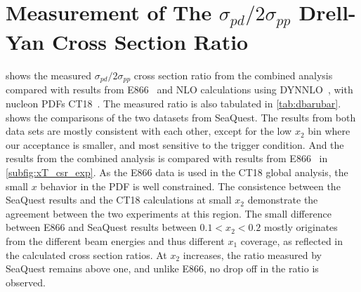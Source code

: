 \documentclass[reprint,aps,unsortedaddress,superscriptaddress,prl,floatfix,showpacs,linenumbers,final]{revtex4-2}
\begin{document}
\section{Measurement of The \texorpdfstring{$\sigma_{pd}/2\sigma_{pp}$}{pd/2pp} Drell-Yan Cross Section Ratio}
\label{sec:csr}
 shows the measured $\sigma_{pd}/2\sigma_{pp}$ cross section ratio from the combined analysis
compared with results from E866~\cite{towell2001} and NLO calculations using DYNNLO~\cite{catani2007,catani2009},
with nucleon PDFs CT18~\cite{hou2021}. The measured ratio is also tabulated in \cref{tab:dbarubar}.
 shows the comparisons of the two datasets from SeaQuest.
The results from both data sets are mostly consistent with each other, except for the low $x_2$ bin where our acceptance is smaller,
and most sensitive to the trigger condition.
And the results from the combined analysis is compared with results from E866~\cite{towell2001} in \cref{subfig:xT_csr_exp}.
As the E866 data is used in the CT18 global analysis, the small $x$ behavior in the PDF is well constrained. 
The consistence between the SeaQuest results and the CT18 calculations at small $x_2$ demonstrate the agreement between
the two experiments at this region.
The small difference between E866 and SeaQuest results between $0.1<x_2<0.2$ mostly originates from the different beam energies
and thus different $x_1$ coverage, as reflected in the calculated cross section ratios. 
At $x_2$ increases, the ratio measured by SeaQuest remains above one, and unlike E866, no drop off in the ratio is observed.
\end{document}
